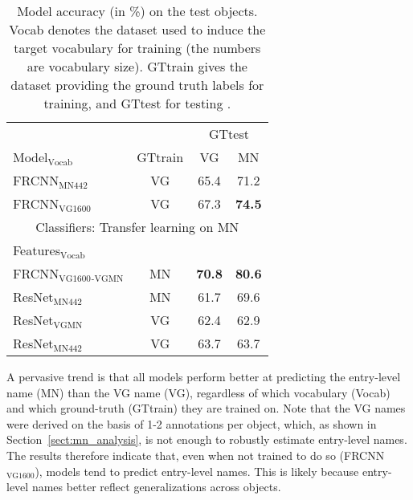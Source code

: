 \begin{table}[t]
	\centering
	\small
	\begin{tabular}{@{~}l@{~}|@{~}c@{~}|cc@{~}}
		\toprule
		&  & \multicolumn{2}{c}{GTtest} \\
		Model$_{\text{Vocab}}$ &  GTtrain &  VG & MN  \\ 
		\midrule
		FRCNN$_{\text{MN442}}$ & VG &  65.4 &      71.2   \\
		FRCNN$_{\text{VG1600}}$ & VG &    67.3 &      {\bf 74.5} \\
		\midrule \midrule
		\multicolumn{4}{c}{Classifiers: Transfer learning on MN}\\
		Features$_{\text{Vocab}}$ &   \\
		\midrule 
		FRCNN$_{\text{VG1600}}$$_{\text{-VGMN}}$ & MN &    {\bf 70.8} &      {\bf 80.6}  \\ 
		\midrule
		
		ResNet$_{\text{MN442}}$ & MN &            61.7 &              69.6  \\
		ResNet$_{\text{VGMN}}$  &   VG &  62.4 &              62.9  \\
		ResNet$_{\text{MN442}}$ & VG  &            63.7 &              63.7   \\
		\bottomrule
	\end{tabular}
	\caption{Model accuracy (in \%) on the \mn test objects. Vocab denotes the dataset used to induce the target vocabulary for training (the numbers are vocabulary size). GTtrain gives the dataset providing the ground truth labels for training, and GTtest for testing \label{tab:exp_VGvsMN}.}
	\vspace{0ex}
\end{table}

A pervasive trend is that all models perform better 
at predicting the entry-level name (MN) than the VG name (VG), regardless of which vocabulary (Vocab) and which ground-truth (GTtrain) they are trained on. 
Note that the VG names were derived on the basis of 1-2 annotations per object, which, as shown in Section~\ref{sect:mn_analysis}, is not enough to robustly estimate entry-level names.
The results therefore indicate that, even when not trained to do so (FRCNN$_{\text{VG1600}}$), models tend to predict entry-level names.
This is likely because entry-level names better reflect generalizations across objects.

